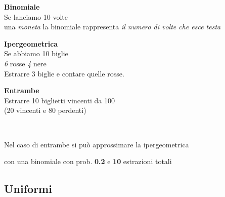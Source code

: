 \documentclass[]{article}
\begin{document}
    \begin{minipage}{0.30\textwidth}
        \textbf{Binomiale} \\
        Se lanciamo 10 volte \\
        una \textit{moneta} la binomiale rappresenta \textit{il numero di volte che esce testa}
    \end{minipage}
    \begin{minipage}{0.30\textwidth}
        \textbf{Ipergeometrica} \\
        Se abbiamo 10 biglie \\
        \textit{6} rosse \textit{4} nere \\
        Estrarre 3 biglie e contare quelle rosse.
    \end{minipage}
    \begin{minipage}{0.30\textwidth}
        \textbf{Entrambe} \\
        Estrarre 10 biglietti vincenti
        da 100 \\
        (20 vincenti e 80 perdenti)
    \end{minipage} \\

    \centerline{Nel caso di entrambe si può approssimare la ipergeometrica}
    \centerline{con una binomiale con prob. \textbf{0.2} e \textbf{10} estrazioni totali} 

    \subsection{Uniformi}
\end{document}
